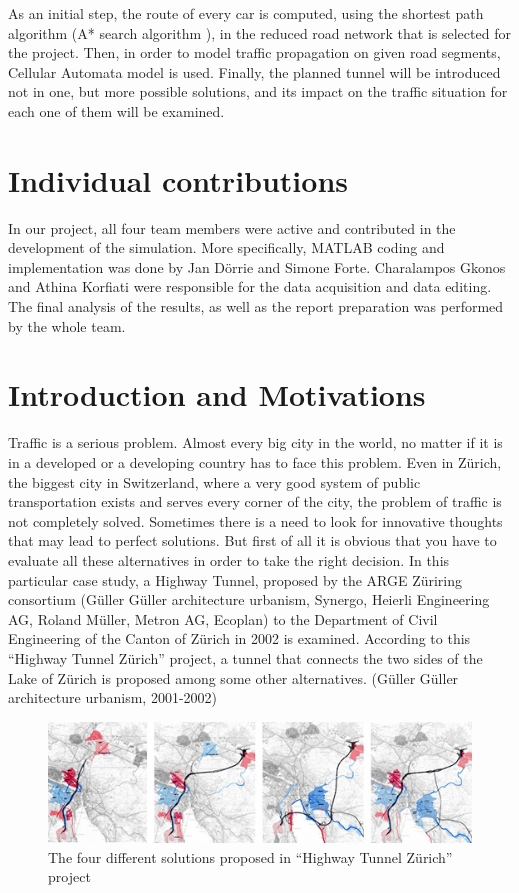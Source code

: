 \documentclass[11pt]{article}
\begin{document}
As an initial step, the route of every car is computed, using the shortest path algorithm (A* search algorithm \cite{astar}), in the reduced road network that is selected for the project. Then, in order to model traffic propagation on given road segments, Cellular Automata model is used. Finally, the planned tunnel will be introduced not in one, but more possible solutions, and its impact on the traffic situation for each one of them will be examined.


\section{Individual contributions}
In our project, all four team members were active and contributed in the development of the simulation. More specifically, MATLAB coding and implementation was done by Jan D\"orrie and Simone Forte. Charalampos Gkonos and Athina Korfiati were responsible for the data acquisition and data editing. The final analysis of the results, as well as the report preparation was performed by the whole team.

\section{Introduction and Motivations}
Traffic is a serious problem. Almost every big city in the world, no matter if it is in a developed or a developing country has to face this problem. Even in Z\"urich, the biggest city in Switzerland, where a very good system of public transportation exists and serves every corner of the city, the problem of traffic is not completely solved. Sometimes there is a need to look for innovative thoughts that may lead to perfect solutions. But first of all it is obvious that you have to evaluate all these alternatives in order to take the right decision. In this particular case study, a Highway Tunnel, proposed by the ARGE Z\"uriring consortium (G\"uller G\"uller architecture urbanism, Synergo, Heierli Engineering AG, Roland M\"uller, Metron AG, Ecoplan) to the Department of Civil Engineering of the Canton of Z\"urich in 2002 is examined. According to this “Highway Tunnel Z\"urich” project, a tunnel that connects the two sides of the Lake of Z\"urich is proposed among some other alternatives. (G\"uller G\"uller architecture urbanism, 2001-2002)

\begin{figure}[ht]
	\begin{center}
		\includegraphics[width=\linewidth]{../img/GG03_1a.jpg}
	\end{center}
	\caption{The four different solutions proposed in ``Highway Tunnel Z\"{u}rich'' project \cite{GGau}}
	\label{fig:tunnel}
\end{figure}
\end{document}
